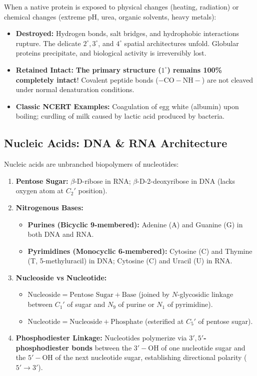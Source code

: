 \documentclass[10pt,a4paper]{article}
\begin{document}
\begin{trapbox}
When a native protein is exposed to physical changes (heating, radiation) or chemical changes (extreme pH, urea, organic solvents, heavy metals):
\begin{itemize}
  \item \textbf{Destroyed:} Hydrogen bonds, salt bridges, and hydrophobic interactions rupture. The delicate $2^\circ, 3^\circ$, and $4^\circ$ spatial architectures unfold. Globular proteins precipitate, and biological activity is irreversibly lost.
  \item \textbf{Retained Intact:} \textbf{The primary structure ($1^\circ$) remains 100\% completely intact}! Covalent peptide bonds ($-\mathrm{CO-NH}-$) are not cleaved under normal denaturation conditions.
  \item \textbf{Classic NCERT Examples:} Coagulation of egg white (albumin) upon boiling; curdling of milk caused by lactic acid produced by bacteria.
\end{itemize}
\end{trapbox}

\subsection{Nucleic Acids: DNA \& RNA Architecture}

\begin{conceptbox}
Nucleic acids are unbranched biopolymers of nucleotides:
\begin{enumerate}[leftmargin=*]
  \item \textbf{Pentose Sugar:} $\beta$-D-ribose in RNA; $\beta$-D-2-deoxyribose in DNA (lacks oxygen atom at $C_2'$ position).
  \item \textbf{Nitrogenous Bases:}
  \begin{itemize}
    \item \textbf{Purines (Bicyclic 9-membered):} Adenine (A) and Guanine (G) in both DNA and RNA.
    \item \textbf{Pyrimidines (Monocyclic 6-membered):} Cytosine (C) and Thymine (T, 5-methyluracil) in DNA; Cytosine (C) and Uracil (U) in RNA.
  \end{itemize}
  \item \textbf{Nucleoside vs Nucleotide:}
  \begin{itemize}
    \item $\text{Nucleoside} = \text{Pentose Sugar} + \text{Base}$ (joined by $N$-glycosidic linkage between $C_1'$ of sugar and $N_9$ of purine or $N_1$ of pyrimidine).
    \item $\text{Nucleotide} = \text{Nucleoside} + \text{Phosphate}$ (esterified at $C_5'$ of pentose sugar).
  \end{itemize}
  \item \textbf{Phosphodiester Linkage:} Nucleotides polymerize via \textbf{$3',5'$-phosphodiester bonds} between the $3'-\mathrm{OH}$ of one nucleotide sugar and the $5'-\mathrm{OH}$ of the next nucleotide sugar, establishing directional polarity ($5' \to 3'$).
\end{enumerate}
\end{conceptbox}
\end{document}
